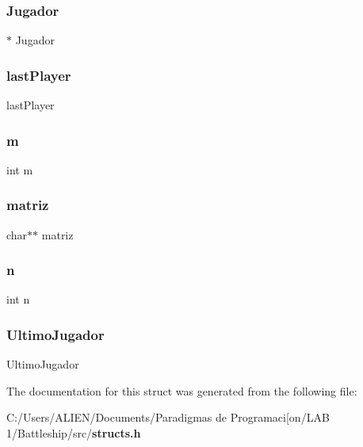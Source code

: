 \subsubsection{Jugador}
{\footnotesize{}$\ast$ Jugador}

\label{struct_board_a1f004d7e9bf005e7cea3845268f11045} 
\subsubsection{last\+Player}
{\footnotesize{} last\+Player}

\label{struct_board_a742204794ea328ba293fe59cec79b990} 
\subsubsection{m}
{\footnotesize\ttfamily int m}

\label{struct_board_ad92c7212b6b057929b2079f4f0bc4811} 
\subsubsection{matriz}
{\footnotesize\ttfamily char$\ast$$\ast$ matriz}

\label{struct_board_a76f11d9a0a47b94f72c2d0e77fb32240} 
\subsubsection{n}
{\footnotesize\ttfamily int n}

\label{struct_board_a5e46f00fda855006138e8ff65f396dc5} 
\subsubsection{Ultimo\+Jugador}
{\footnotesize{} Ultimo\+Jugador}



The documentation for this struct was generated from the following file\+:\begin{DoxyCompactItemize}
\item 
C\+:/\+Users/\+A\+L\+I\+E\+N/\+Documents/\+Paradigmas de Programaci[on/\+L\+A\+B 1/\+Battleship/src/{\bf structs.\+h}\end{DoxyCompactItemize}
